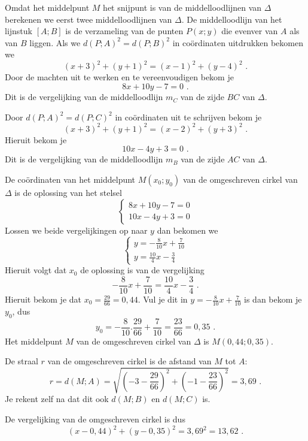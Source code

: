 \begin{voorbeeld}

Omdat het middelpunt $M$ het snijpunt is van de middelloodlijnen van $\Delta$ berekenen we eerst twee middelloodlijnen van $\Delta$.
De middelloodlijn van het lijnstuk $[A;B]$ is de verzameling van de punten $P(x;y)$ die evenver van $A$ als van $B$ liggen.
Als we $d(P;A)^2=d(P;B)^2$ in co\"ordinaten uitdrukken bekomen we
\[
(x+3)^2+(y+1)^2=(x-1)^2+(y-4)^2 \text { .}
\]
Door de machten uit te werken en te vereenvoudigen bekom je
\[
8x+10y-7=0 \text { .}
\]
Dit is de vergelijking van de middelloodlijn $m_C$ van de zijde $BC$ van $\Delta$.

Door $d(P;A)^2=d(P;C)^2$ in co\"ordinaten uit te schrijven bekom je
\[
(x+3)^2+(y+1)^2=(x-2)^2+(y+3)^2 \text { .}
\]
Hieruit bekom je
\[
10x-4y+3=0 \text { .}
\]
Dit is de vergelijking van de middelloodlijn $m_B$ van de zijde $AC$ van $\Delta$.

De co\"ordinaten van het middelpunt $M(x_0;y_0)$ van de omgeschreven cirkel van $\Delta$ is de oplossing van het stelsel
\[
\begin{cases}
8x+10y-7=0\\
10x-4y+3=0
\end{cases}
\]
Lossen we beide vergelijkingen op naar $y$ dan bekomen we
\[
\begin{cases}
y=-\frac {8}{10}x+\frac {7}{10}\\
y=\frac {10}{4}x-\frac {3}{4}
\end{cases}
\]
Hieruit volgt dat $x_0$ de oplossing is van de vergelijking
\[
-\frac {8}{10}x+\frac {7}{10}=\frac {10}{4}x-\frac {3}{4} \text { .}
\]
Hieruit bekom je dat $x_0=\frac {29}{66}=0,44$.
Vul je dit in $y=-\frac {8}{10}x+\frac {7}{10}$ is dan bekom je $y_0$, dus
\[
y_0=-\frac {8}{10}.\frac {29}{66}+\frac {7}{10}=\frac {23}{66}=0,35 \text { .}
\]
Het middelpunt $M$ van de omgeschreven cirkel van $\Delta$ is $M(0,44;0,35)$.

De straal $r$ van de omgeschreven cirkel is de afstand van $M$ tot $A$:
\[
r=d(M;A)=\sqrt {\left(  -3-\frac {29}{66} \right)^2+\left( -1-\frac {23}{66} \right)^2}=3,69 \text { .}
\]
Je rekent zelf na dat dit ook $d(M;B)$ en $d(M;C)$ is.

De vergelijking van de omgeschreven cirkel is dus
\[
(x-0,44)^2+(y-0,35)^2=3,69^2=13,62 \text { .}
\]\\


\end{voorbeeld}
